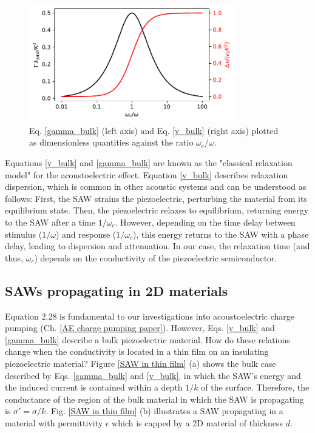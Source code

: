 \documentclass[double,12pt,1in]{beavtex}
\begin{document}
\begin{figure}
    \includegraphics[width=0.8\textwidth]{gamma_and_v.pdf}
    \caption{Eq. \ref{gamma_bulk} (left axis) and Eq. \ref{v_bulk} (right axis) plotted as dimensionless quantities against the ratio $\omega_c/\omega$.}
    \label{gamma_and_v}
\end{figure}
Equations \ref{v_bulk} and \ref{gamma_bulk} are known as the "classical relaxation model" for the acoustoelectric effect. Equation \ref{v_bulk} describes relaxation dispersion, which is common in other acoustic systems \cite{hutson_elastic_1962, rudenko_dispersive_2022} and can be understood as follows: First, the SAW strains the piezoelectric, perturbing the material from its equilibrium state. Then, the piezoelectric relaxes to equilibrium, returning energy to the SAW after a time $1/\omega_c$. However, depending on the time delay between stimulus ($1/\omega$) and response ($1/\omega_c$), this energy returns to the SAW with a phase delay, leading to dispersion and attenuation. In our case, the relaxation time (and thus, $\omega_c$) depends on the conductivity of the piezoelectric semiconductor. 

\subsection{SAWs propagating in 2D materials}

Equation 2.28 is fundamental to our investigations into acoustoelectric charge pumping
(Ch. \ref{AE charge pumping paper}). However, Eqs. \ref{v_bulk} and \ref{gamma_bulk} describe a bulk piezoelectric material. How do these relations change when the conductivity is located in a thin film on an insulating piezoelectric material? Figure \ref{SAW in thin film} (a) shows the bulk case described by Eqs. \ref{gamma_bulk} and \ref{v_bulk}, in which the SAW's energy and the induced current is contained within a depth $1/k$ of the surface. Therefore, the conductance of the region of the bulk material in which the SAW is propagating is $\sigma' = \sigma/k$. Fig. \ref{SAW in thin film} (b) illustrates a SAW propagating in a material with permittivity $\epsilon$ which is capped by a 2D material of thickness $d$. 
\end{document}
